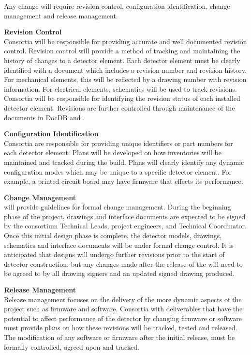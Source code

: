Any change will require revision control, configuration
identification, change management and release management.

{\bf Revision Control}\\ Consortia will be responsible for providing
accurate and well documented revision control.  Revision control
will provide a method of tracking and maintaining the history of
changes to a detector element.  Each detector element must be clearly
identified with a document which includes a revision number and
revision history.  For mechanical elements, this will be reflected by
a drawing number with revision information.  For electrical elements,
schematics will be used to track revisions.  Consortia will be
responsible for identifying the revision status of each installed
detector element. Revisions are further controlled through maintenance
of the documents in DocDB and .

{\bf Configuration Identification}\\
Consortia are responsible for providing unique identifiers or part
numbers for each detector element.  Plans will be developed on how
inventories will be maintained and tracked during the build.  Plans
will clearly identify any dynamic configuration modes which may be
unique to a specific detector element.  For example, a printed circuit
board may have firmware that effects its performance.

{\bf Change Management}\\
 will provide guidelines
for formal change management.  During the beginning phase of the
project, drawings and interface documents are expected to be signed by
the consortium Technical Leads, project engineers, and Technical
Coordinator.  Once this initial design phase is complete, the detector
models, drawings, schematics and interface documents will be under
formal change control.  It is anticipated that designs will undergo
further revisions prior to the start of detector construction, but any
changes made after the release of the  will
need to be agreed to by all drawing signers and an updated signed
drawing produced.

{\bf Release Management}\\
Release management focuses on the delivery of the more dynamic aspects
of the project such as firmware and software.  Consortia with
deliverables that have the potential to affect performance of the
detector by changing firmware or software must provide plans on how
these revisions will be tracked, tested and released.  The
modification of any software or firmware after the initial release,
must be formally controlled, agreed upon and tracked.


